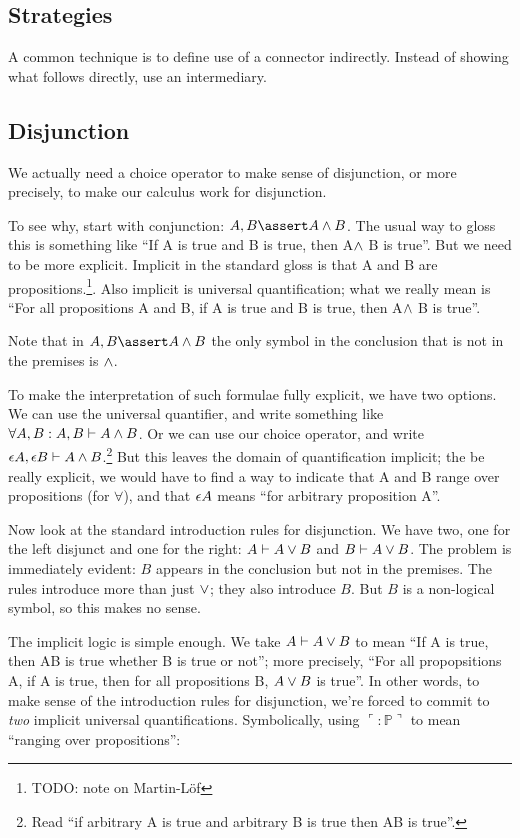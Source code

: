 \documentclass{article}
\begin{document}
\subsection{Strategies}

A common technique is to define use of a connector indirectly.  Instead of showing what follows directly, use an intermediary.

\subsection{Disjunction}

We actually need a choice operator to make sense of disjunction, or
more precisely, to make our calculus work for disjunction.

To see why, start with conjunction: \(A, B\linfer A\lkand B\). The
usual way to gloss this is something like ``If A is true and B is
true, then A\(\land\) B is true''. But we need to be more explicit.
Implicit in the standard gloss is that A and B are
propositions.\footnote{TODO: note on Martin-Löf}. Also implicit is
universal quantification; what we really mean is ``For all
propositions A and B, if A is true and B is true, then A\(\land\) B
is true''.

Note that in \(A, B\linfer A\lkand B\) the only symbol in the
conclusion that is not in the premises is \(\land\).

To make the interpretation of such formulae fully explicit, we have
two options. We can use the universal quantifier, and write something
like \(\forall A, B: A, B\vdash A\land B\). Or we can use our choice
operator, and write \(\epsilon A, \epsilon B\vdash A\land
B\).\footnote{Read ``if arbitrary A is true and arbitrary B is true
then A\lkand B is true''.} But this leaves the domain of
quantification implicit; the be really explicit, we would have to find
a way to indicate that A and B range over propositions (for
\(\forall\)), and that \(\epsilon A\) means ``for arbitrary proposition
A''.

Now look at the standard introduction rules for disjunction. We have
two, one for the left disjunct and one for the right: \(A\vdash A\lor
B\) and \(B\vdash A\lor B\). The problem is immediately evident:
\(B\) appears in the conclusion but not in the premises. The rules
introduce more than just \(\lor\); they also introduce \(B\). But
\(B\) is a non-logical symbol, so this makes no sense.

The implicit logic is simple enough. We take \(A\vdash A\lor B\) to
mean ``If A is true, then A\lkor B is true whether B is true or not'';
more precisely, ``For all propopsitions A, if A is true, then for all
propositions B, \(A\lor B\) is true''. In other words, to make sense
of the introduction rules for disjunction, we're forced to commit to
\textit{two} implicit universal quantifications. Symbolically, using
\(\ulcorner :\mathbb{P}\urcorner\) to mean ``ranging over
propositions'':
\end{document}
